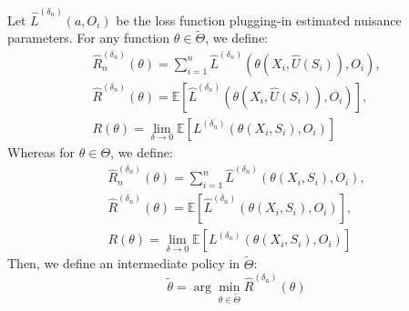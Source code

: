 \documentclass[12pt]{article}
\newcommand{\E}{\mathbb{E}}
\begin{document}
Let $\widehat L^{({\delta_n})}(a,O_i)$ be the loss function plugging-in estimated nuisance parameters. For any function $\theta\in \widetilde\Theta$, we define:
\begin{gather}
   \widehat R_n^{({\delta_n})}(\theta) = \sum_{i=1}^n\widehat L^{({\delta_n})}(\theta(X_i,\widehat U(S_i)),O_i),\nonumber\\
   \widehat R^{({\delta_n})}(\theta) = \E[\widehat L^{({\delta_n})}(\theta(X_i,\widehat U(S_i)),O_i)], \nonumber\\
   R(\theta) = \lim_{\delta\rightarrow 0}\E\left[L^{(\delta_n)}(\theta(X_i,S_i),O_i)\right]
   \nonumber\label{eq:plug_in_risk}
\end{gather}
Whereas for $\theta\in\Theta$, we define:
\begin{gather*}
 \widehat R_n^{({\delta_n})}(\theta) = \sum_{i=1}^n\widehat L^{({\delta_n})}(\theta(X_i,S_i),O_i),\nonumber\\
   \widehat R^{({\delta_n})}(\theta) = \E[\widehat L^{({\delta_n})}(\theta(X_i,S_i),O_i)], \nonumber\\
    R(\theta) = \lim_{\delta\rightarrow 0}\E\left[L^{(\delta_n)}(\theta(X_i,S_i),O_i)\right]\nonumber
\end{gather*}
Then, we define an intermediate policy in $\widetilde\Theta$:
\begin{equation}\label{eq:different_thetas}
    \tilde \theta = \arg\min_{\theta\in \widetilde\Theta} \widehat R^{({\delta_n})}(\theta)
\end{equation}
\end{document}
